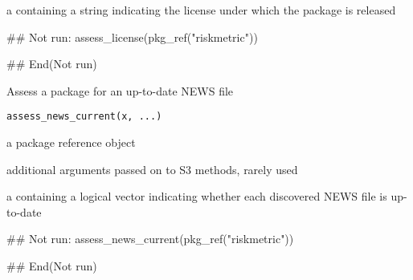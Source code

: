 \documentclass[a4paper]{book}
\begin{document}
%
\begin{Value}
a  containing a string indicating the license under which the package is released
\end{Value}
%
\begin{SeeAlso}
\end{SeeAlso}
%
\begin{Examples}
\begin{ExampleCode}
## Not run: 
assess_license(pkg_ref("riskmetric"))

## End(Not run)
\end{ExampleCode}
\end{Examples}
%
\begin{Description}
Assess a package for an up-to-date NEWS file
\end{Description}
%
\begin{Usage}
\begin{verbatim}
assess_news_current(x, ...)
\end{verbatim}
\end{Usage}
%
\begin{Arguments}
\begin{ldescription}
\item[\code{x}] a  package reference object

\item[\code{...}] additional arguments passed on to S3 methods, rarely used
\end{ldescription}
\end{Arguments}
%
\begin{Value}
a  containing a logical vector indicating whether each discovered NEWS file is up-to-date
\end{Value}
%
\begin{SeeAlso}
\end{SeeAlso}
%
\begin{Examples}
\begin{ExampleCode}
## Not run: 
assess_news_current(pkg_ref("riskmetric"))

## End(Not run)
\end{ExampleCode}
\end{Examples}
\end{document}
